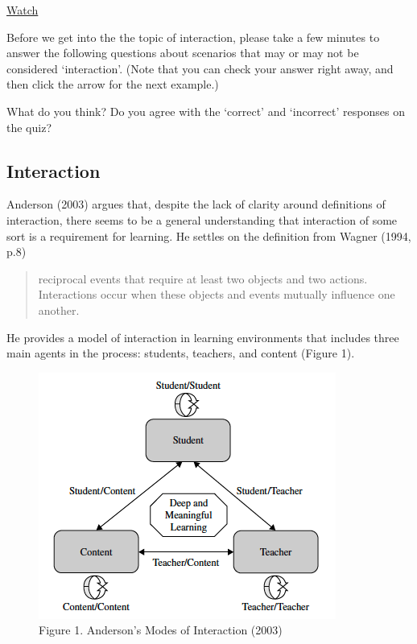 \documentclass[
]{book}
\begin{document}
\href{https://youtu.be/G2y8Sx4B2Sk}{Watch}

Before we get into the the topic of interaction, please take a few minutes to answer the following questions about scenarios that may or may not be considered `interaction'.
(Note that you can check your answer right away, and then click the arrow for the next example.)

What do you think? Do you agree with the `correct' and `incorrect' responses on the quiz?

\hypertarget{interaction}{%
\subsection*{Interaction}\label{interaction}}

Anderson (2003) argues that, despite the lack of clarity around definitions of interaction, there seems to be a general understanding that interaction of some sort is a requirement for learning. He settles on the definition from Wagner (1994, p.8)

\begin{quote}
reciprocal events that require at least two objects and two actions. Interactions occur when these objects and events mutually influence one another.
\end{quote}

He provides a model of interaction in learning environments that includes three main agents in the process: students, teachers, and content (Figure 1).

\begin{figure}
\centering
\includegraphics{assets/u2/Modes-Interaction-Anderson.png}
\caption{Figure 1. Anderson's Modes of Interaction (2003)}
\end{figure}
\end{document}
